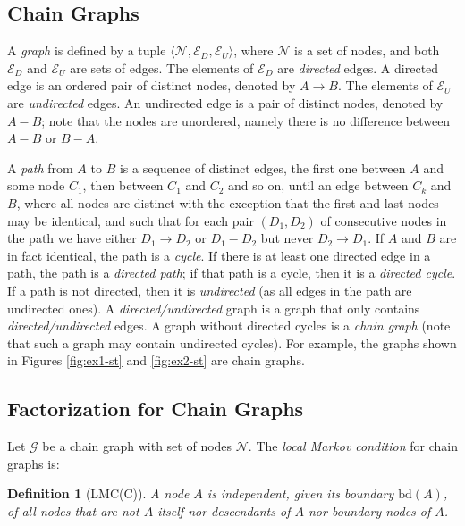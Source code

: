 \documentclass{article}
\newtheorem{definition}{Definition}
\begin{document}
\subsection{Chain Graphs}

A \emph{graph} is defined by a tuple $\langle \mathcal{N}, \mathcal{E}_D, \mathcal{E}_U \rangle$, where $\mathcal{N}$ is a set of nodes, and both $\mathcal{E}_D$ and $\mathcal{E}_U$ are sets of edges. The elements of $\mathcal{E}_D$ are \emph{directed} edges. A directed edge is an ordered pair of distinct nodes, denoted by $A \rightarrow B$. The elements of $\mathcal{E}_U$ are \emph{undirected} edges. An undirected edge is a pair of distinct nodes, denoted by $A - B$; note that the nodes are unordered, namely there is no difference between $A - B$ or $B - A$. 

A \emph{path} from $A$ to $B$ is a sequence of distinct edges, the first one between $A$ and some node $C_1$, then between $C_1$ and $C_2$ and so on, until an edge between $C_k$ and $B$, where all nodes are distinct with the exception that the first and last nodes may be identical, and such that for each pair $(D_1,D_2)$ of consecutive nodes in the path we have either $D_1 \rightarrow D_2$ or $D_1 - D_2$ but never $D_2 \rightarrow D_1$. If $A$ and $B$ are in fact identical, the path is a \emph{cycle}. If there is at least one directed edge in a path, the path is a \emph{directed path}; if that path is a cycle, then it is a \emph{directed cycle}. If a path is not directed, then it is \emph{undirected} (as all edges in the path are undirected ones). A \emph{directed/undirected} graph is a graph that only contains \emph{directed/undirected} edges. A graph without directed cycles is a \emph{chain graph} (note that such a graph may contain undirected cycles). For example, the graphs shown in Figures \ref{fig:ex1-st} and \ref{fig:ex2-st} are chain graphs.

\subsection{Factorization for Chain Graphs}

Let $\mathcal{G}$ be a chain graph with set of nodes $\mathcal{N}$. The \emph{local Markov condition} for chain graphs is:

\begin{definition}[LMC(C)]
    A node $A$ is independent, given its boundary $\mbox{bd}(A)$, of all nodes that are not $A$ itself nor descendants of $A$ nor boundary nodes of $A$. 
\end{definition}
\end{document}
